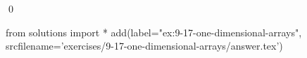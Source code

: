 
\begin{ex}
  \label{ex:9-17-one-dimensional-arrays}
  
  \qed
\end{ex}
\begin{python0}
from solutions import *
add(label="ex:9-17-one-dimensional-arrays",
    srcfilename='exercises/9-17-one-dimensional-arrays/answer.tex')
\end{python0}
